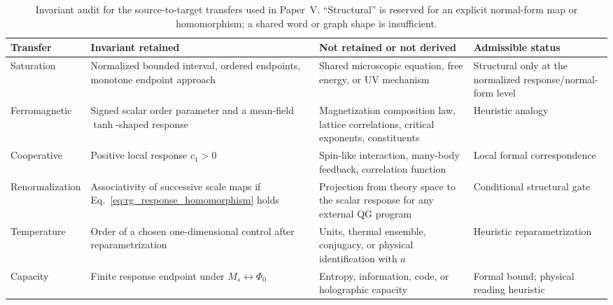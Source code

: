 \documentclass[aps,prd,twocolumn,superscriptaddress,nofootinbib]{revtex4-2}
\begin{document}
\begin{table}[t]
\caption{Invariant audit for the source-to-target transfers used in Paper~V. ``Structural'' is reserved for an explicit normal-form map or homomorphism; a shared word or graph shape is insufficient.}
\label{tab:metaphor_invariants}
\begin{ruledtabular}
\begin{tabular}{llll}
\parbox[t]{0.14\textwidth}{Transfer} & \parbox[t]{0.25\textwidth}{Invariant retained} & \parbox[t]{0.32\textwidth}{Not retained or not derived} & \parbox[t]{0.18\textwidth}{Admissible status} \\
\hline
\parbox[t]{0.14\textwidth}{Saturation} & \parbox[t]{0.25\textwidth}{Normalized bounded interval, ordered endpoints, monotone endpoint approach} & \parbox[t]{0.32\textwidth}{Shared microscopic equation, free energy, or UV mechanism} & \parbox[t]{0.18\textwidth}{Structural only at the normalized response/normal-form level} \\[0.5em]
\parbox[t]{0.14\textwidth}{Ferromagnetic} & \parbox[t]{0.25\textwidth}{Signed scalar order parameter and a mean-field $\tanh$-shaped response} & \parbox[t]{0.32\textwidth}{Magnetization composition law, lattice correlations, critical exponents, constituents} & \parbox[t]{0.18\textwidth}{Heuristic analogy} \\[0.5em]
\parbox[t]{0.14\textwidth}{Cooperative} & \parbox[t]{0.25\textwidth}{Positive local response $c_1>0$} & \parbox[t]{0.32\textwidth}{Spin-like interaction, many-body feedback, correlation function} & \parbox[t]{0.18\textwidth}{Local formal correspondence} \\[0.5em]
\parbox[t]{0.14\textwidth}{Renormalization} & \parbox[t]{0.25\textwidth}{Associativity of successive scale maps if Eq.~\eqref{eq:rg_response_homomorphism} holds} & \parbox[t]{0.32\textwidth}{Projection from theory space to the scalar response for any external QG program} & \parbox[t]{0.18\textwidth}{Conditional structural gate} \\[0.5em]
\parbox[t]{0.14\textwidth}{Temperature} & \parbox[t]{0.25\textwidth}{Order of a chosen one-dimensional control after reparametrization} & \parbox[t]{0.32\textwidth}{Units, thermal ensemble, conjugacy, or physical identification with $a$} & \parbox[t]{0.18\textwidth}{Heuristic reparametrization} \\[0.5em]
\parbox[t]{0.14\textwidth}{Capacity} & \parbox[t]{0.25\textwidth}{Finite response endpoint under $M_s\leftrightarrow\Phi_0$} & \parbox[t]{0.32\textwidth}{Entropy, information, code, or holographic capacity} & \parbox[t]{0.18\textwidth}{Formal bound; physical reading heuristic} \\
\end{tabular}
\end{ruledtabular}
\end{table}
\end{document}
